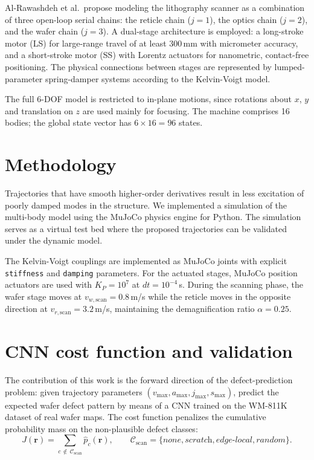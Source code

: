\documentclass[11pt,letterpaper]{article}
\begin{document}
Al-Rawashdeh et al.\ propose modeling the lithography scanner as a combination of three open-loop serial chains: the reticle chain ($j=1$), the optics chain ($j=2$), and the wafer chain ($j=3$). A dual-stage architecture is employed: a long-stroke motor (LS) for large-range travel of at least 300\,mm with micrometer accuracy, and a short-stroke motor (SS) with Lorentz actuators for nanometric, contact-free positioning. The physical connections between stages are represented by lumped-parameter spring-damper systems according to the Kelvin-Voigt model.

The full 6-DOF model is restricted to in-plane motions, since rotations about $x$, $y$ and translation on $z$ are used mainly for focusing. The machine comprises 16 bodies; the global state vector has $6\times 16 = 96$ states.

\section*{Methodology}

Trajectories that have smooth higher-order derivatives result in less excitation of poorly damped modes in the structure. We implemented a simulation of the multi-body model using the MuJoCo physics engine for Python. The simulation serves as a virtual test bed where the proposed trajectories can be validated under the dynamic model.

The Kelvin-Voigt couplings are implemented as MuJoCo joints with explicit \texttt{stiffness} and \texttt{damping} parameters. For the actuated stages, MuJoCo position actuators are used with $K_P = 10^7$ at $dt = 10^{-4}$\,s. During the scanning phase, the wafer stage moves at $v_{w,\text{scan}} = 0.8$\,m/s while the reticle moves in the opposite direction at $v_{r,\text{scan}} = 3.2$\,m/s, maintaining the demagnification ratio $\alpha = 0.25$.

\section*{CNN cost function and validation}

The contribution of this work is the forward direction of the defect-prediction problem: given trajectory parameters $(v_{\max}, a_{\max}, j_{\max}, s_{\max})$, predict the expected wafer defect pattern by means of a CNN trained on the WM-811K dataset of real wafer maps. The cost function penalizes the cumulative probability mass on the non-plausible defect classes:
\begin{equation}
    J(\boldsymbol{r}) = \sum_{c\,\notin\,\mathcal{C}_{\text{scan}}} \hat{p}_c(\boldsymbol{r}),
    \qquad
    \mathcal{C}_{\text{scan}} = \{\textit{none}, \textit{scratch}, \textit{edge-local}, \textit{random}\}.
\end{equation}
\end{document}

